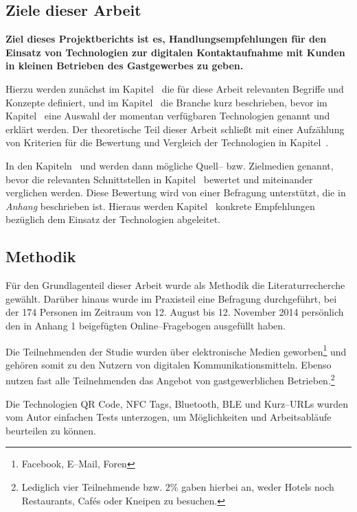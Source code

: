 \subsection{Ziele dieser Arbeit} %

\textbf{Ziel dieses Projektberichts ist es, Handlungsempfehlungen für den Einsatz von Technologien zur digitalen Kontaktaufnahme mit Kunden in kleinen Betrieben des Gastgewerbes zu geben.}

Hierzu werden zunächst im Kapitel~ die für diese Arbeit relevanten Begriffe und Konzepte definiert, und im Kapitel~ die Branche kurz beschrieben, bevor im Kapitel~ eine Auswahl der momentan verfügbaren Technologien genannt und erklärt werden.
Der theoretische Teil dieser Arbeit schließt mit einer Aufzählung von Kriterien für die Bewertung und Vergleich der Technologien in Kapitel~.

In den Kapiteln~ und  werden dann mögliche Quell– bzw. Zielmedien genannt, bevor  die relevanten Schnittstellen in Kapitel~ bewertet und miteinander verglichen werden. Diese Bewertung wird von einer Befragung unterstützt, die in \textit{Anhang} beschrieben ist. Hieraus werden Kapitel~ konkrete Empfehlungen bezüglich dem Einsatz der Technologien abgeleitet.

\subsection{Methodik} %
\label{sub:methodik}
Für den Grundlagenteil dieser Arbeit wurde als Methodik die Literaturrecherche gewählt. Darüber hinaus wurde im Praxisteil eine Befragung durchgeführt, bei der 174 Personen im Zeitraum von 12. August bis 12. November 2014 persönlich den in Anhang 1 beigefügten Online–Fragebogen ausgefüllt haben. 

Die Teilnehmenden der Studie wurden über elektronische Medien geworben\footnote{Facebook, E–Mail, Foren} und gehören somit zu den Nutzern von digitalen Kommunikationsmitteln. Ebenso nutzen fast alle Teilnehmenden das Angebot von gastgewerblichen Betrieben.\footnote{Lediglich vier Teilnehmende bzw. 2\% gaben hierbei an, weder Hotels noch Restaurants, Cafés oder Kneipen zu besuchen.}

Die Technologien \ac{QR Code}, \ac{NFC} Tags, Bluetooth, \ac{BLE} und Kurz–URLs wurden vom Autor einfachen Tests unterzogen, um Möglichkeiten und Arbeitsabläufe beurteilen zu können.

